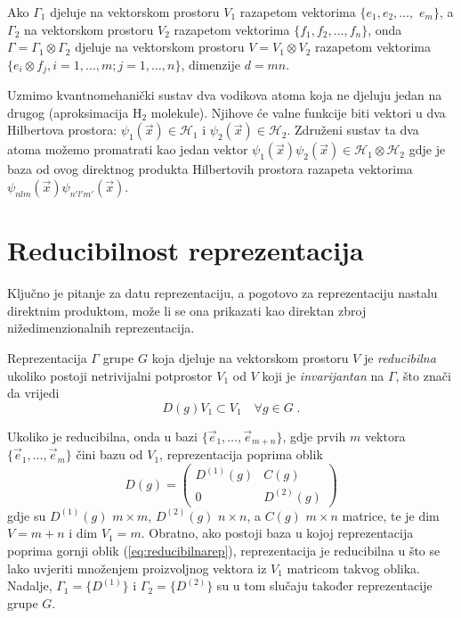 Ako $\Gamma_1$ djeluje na vektorskom prostoru $V_1$ razapetom
vektorima $\{e_1, e_2, \ldots,$ $e_m\}$, a $\Gamma_2$ na vektorskom
prostoru $V_2$ razapetom vektorima $\{f_1, f_2, \ldots, f_n\}$,
onda $\Gamma=\Gamma_1 \otimes \Gamma_2$ djeluje na vektorskom
prostoru $V=V_1 \otimes V_2$ razapetom vektorima
$\{e_{i}\otimes f_{j}, i=1,\ldots, m; j=1,\ldots, n\}$,
dimenzije $d=mn$.

\begin{primjer}
Uzmimo kvantnomehanički sustav dva vodikova atoma koja ne djeluju jedan
na drugog (aproksimacija H$_2$ molekule). Njihove će valne funkcije 
biti vektori u dva Hilbertova prostora:
$\psi_{1}(\vec{x})\in \mathcal{H}_1$ i 
$\psi_{2}(\vec{x})\in \mathcal{H}_2$.
Združeni sustav ta dva atoma možemo promatrati kao jedan vektor
$\psi_{1}(\vec{x})\psi_{2}(\vec{x}) \in \mathcal{H}_1
\otimes \mathcal{H}_2$ gdje je baza od ovog direktnog
produkta Hilbertovih prostora razapeta vektorima
$\psi_{nlm}(\vec{x})\psi_{n'l'm'}(\vec{x})$.
\end{primjer}


\section{Reducibilnost reprezentacija}

Ključno je pitanje za datu reprezentaciju, a pogotovo za reprezentaciju
nastalu direktnim produktom, može li se ona prikazati kao direktan
zbroj nižedimenzionalnih reprezentacija. 
\begin{definicija}
Reprezentacija $\Gamma$ grupe $G$ koja djeluje na vektorskom
prostoru $V$  je \emph{reducibilna} ukoliko postoji netrivijalni
potprostor $V_{1}$ od $V$ koji je \emph{invarijantan} na $\Gamma$,
što znači da vrijedi
\begin{displaymath}
    D(g)V_{1}\subset V_{1} \quad \forall g \in G \;.
\end{displaymath}
\end{definicija}
Ukoliko je reducibilna,
onda u bazi $\{\vec{e}_1, \ldots, \vec{e}_{m+n} \}$, gdje prvih $m$
vektora $\{\vec{e}_1, \ldots, \vec{e}_{m} \}$ čini bazu od
$V_1$, reprezentacija poprima oblik
\begin{equation}
 D(g) = \begin{pmatrix}
  D^{(1)}(g) & C(g) \\
     0       & D^{(2)}(g) 
\end{pmatrix}
\label{eq:reducibilnarep}
\end{equation}
gdje su $D^{(1)}(g)$ $m\times m$, $D^{(2)}(g)$ $n\times n$,
a $C(g)$ $m\times n$ matrice, te je dim $V=m+n$ i dim $V_1=m$.
Obratno, ako postoji baza u kojoj reprezentacija poprima
gornji oblik (\ref{eq:reducibilnarep}), reprezentacija je reducibilna
u što se lako uvjeriti množenjem proizvoljnog vektora iz $V_1$ matricom
takvog oblika.
Nadalje, $\Gamma_1=\{D^{(1)}\}$ i $\Gamma_2=\{D^{(2)}\}$ su u tom
slučaju također reprezentacije grupe $G$.

